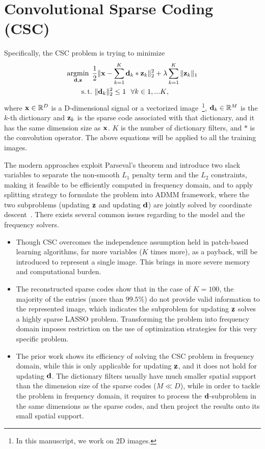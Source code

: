 \section{Convolutional Sparse Coding (CSC)}
Specifically, the CSC problem is trying to minimize
\begin{equation}
\begin{split}
    \minimize{\filter,\code} & \frac{1}{2}\|\signal - \sum_{k=1}^{K} \filter_k * \code_k \|_2^2 + \lambda \sum_{k=1}^{K}\| \code_k \|_1 \\
    \subjectto & ~ \|\filter_k\|^2_2 \leq 1 ~~ \forall k \in {1,...K},
\end{split}
\end{equation}
where $\signal \in \mathbb{R}^D$ is a D-dimensional signal or a vectorized image~\footnote{In this manuscript, we work on 2D images.}, $\filter_k \in \mathbb{R}^M$ is the $k$-th dictionary and $\code_k$ is the sparse code associated with that dictionary, and it has the same dimension size as $\signal$. $K$ is the number of dictionary filters, and $*$ is the convolution operator. The above equations will be applied to all the training images.

The modern approaches exploit Parseval's theorem and introduce two slack variables to separate the non-smooth $L_1$ penalty term and the $L_2$ constraints, making it feasible to be efficiently computed in frequency domain, and to apply splitting strategy to formulate the problem into ADMM framework, where the two subproblems (updating $\code$ and updating $\filter$) are jointly solved by coordinate descent~\cite{bristow2013fast,heide2015fast,wohlberg2016efficient}. There exists several common issues regarding to the model and the frequency solvers.

\begin{itemize}
  \item Though CSC overcomes the independence assumption held in patch-based learning algorithms, far more variables ($K$ times more), as a payback, will be introduced to represent a single image. This brings in more severe memory and computational burden.
  \item The reconstructed sparse codes show that in the case of $K=100$, the majority of the entries (more than $99.5\%$) do not provide valid information to the represented image, which indicates the subproblem for updating $\code$ solves a highly sparse LASSO problem. Transforming the problem into frequency domain imposes restriction on the use of optimization strategies for this very specific problem.
  \item The prior work shows its efficiency of solving the CSC problem in frequency domain, while this is only applicable for updating $\code$, and it does not hold for updating $\filter$. The dictionary filters usually have much smaller spatial support than the dimension size of the sparse codes ($M \ll D$), while in order to tackle the problem in frequency domain, it requires to process the $\filter$-subproblem in the same dimensions as the sparse codes, and then project the results onto its small spatial support.
\end{itemize}